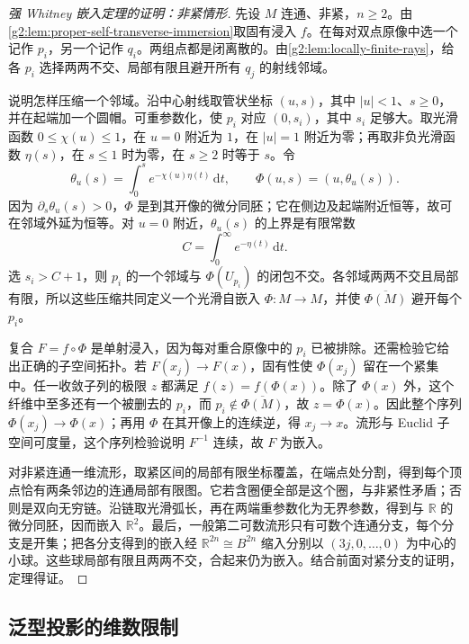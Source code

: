 \begin{proof}[强 Whitney 嵌入定理的证明：非紧情形]
	先设 \(M\) 连通、非紧，\(n\ge2\)。由\cref{g2:lem:proper-self-transverse-immersion}取固有浸入 \(f\)。在每对双点原像中选一个记作 \(p_i\)，另一个记作 \(q_i\)。两组点都是闭离散的。由\cref{g2:lem:locally-finite-rays}，给各 \(p_i\) 选择两两不交、局部有限且避开所有 \(q_j\) 的射线邻域。

	说明怎样压缩一个邻域。沿中心射线取管状坐标 \((u,s)\)，其中 \(|u|<1\)、\(s\ge0\)，并在起端加一个圆帽。可重参数化，使 \(p_i\) 对应 \((0,s_i)\)，其中 \(s_i\) 足够大。取光滑函数 \(0\le\chi(u)\le1\)，在 \(u=0\) 附近为 \(1\)，在 \(|u|=1\) 附近为零；再取非负光滑函数 \(\eta(s)\)，在 \(s\le1\) 时为零，在 \(s\ge2\) 时等于 \(s\)。令
	\[
		\theta_u(s)=\int_0^s e^{-\chi(u)\eta(t)}\,\mathrm{d}t,
		\qquad \Phi(u,s)=(u,\theta_u(s)).
	\]
	因为 \(\partial_s\theta_u(s)>0\)，\(\Phi\) 是到其开像的微分同胚；它在侧边及起端附近恒等，故可在邻域外延为恒等。对 \(u=0\) 附近，\(\theta_u(s)\) 的上界是有限常数
	\[
		C=\int_0^\infty e^{-\eta(t)}\,\mathrm{d}t.
	\]
	选 \(s_i>C+1\)，则 \(p_i\) 的一个邻域与 \(\Phi(U_{p_i})\) 的闭包不交。各邻域两两不交且局部有限，所以这些压缩共同定义一个光滑自嵌入 \(\Phi:M\to M\)，并使 \(\overline{\Phi(M)}\) 避开每个 \(p_i\)。

	复合 \(F=f\circ\Phi\) 是单射浸入，因为每对重合原像中的 \(p_i\) 已被排除。还需检验它给出正确的子空间拓扑。若 \(F(x_j)\to F(x)\)，固有性使 \(\Phi(x_j)\) 留在一个紧集中。任一收敛子列的极限 \(z\) 都满足 \(f(z)=f(\Phi(x))\)。除了 \(\Phi(x)\) 外，这个纤维中至多还有一个被删去的 \(p_i\)，而 \(p_i\notin\overline{\Phi(M)}\)，故 \(z=\Phi(x)\)。因此整个序列 \(\Phi(x_j)\to\Phi(x)\)；再用 \(\Phi\) 在其开像上的连续逆，得 \(x_j\to x\)。流形与 Euclid 子空间可度量，这个序列检验说明 \(F^{-1}\) 连续，故 \(F\) 为嵌入。

	对非紧连通一维流形，取紧区间的局部有限坐标覆盖，在端点处分割，得到每个顶点恰有两条邻边的连通局部有限图。它若含圈便全部是这个圈，与非紧性矛盾；否则是双向无穷链。沿链取光滑弧长，再在两端重参数化为无界参数，得到与 \(\mathbb R\) 的微分同胚，因而嵌入 \(\mathbb R^2\)。最后，一般第二可数流形只有可数个连通分支，每个分支是开集；把各分支得到的嵌入经 \(\mathbb R^{2n}\cong B^{2n}\) 缩入分别以 \((3j,0,\ldots,0)\) 为中心的小球。这些球局部有限且两两不交，合起来仍为嵌入。结合前面对紧分支的证明，定理得证。
\end{proof}

\subsection{泛型投影的维数限制}
\label{g2:subsec:1502:04}

